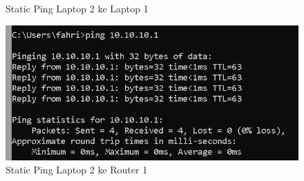 \begin{enumerate}
\begin{figure}[H]
            \caption{Static Ping Laptop 2 ke Laptop 1}
            \label{fig:enter-label}
        \end{figure}
        \begin{figure}[H]
            \centering
            \includegraphics[width=0.5\linewidth]{P1/img/pingrouter2.png}
            \caption{Static Ping Laptop 2 ke Router 1}
            \label{fig:enter-label}
        \end{figure}
        
\end{enumerate}

